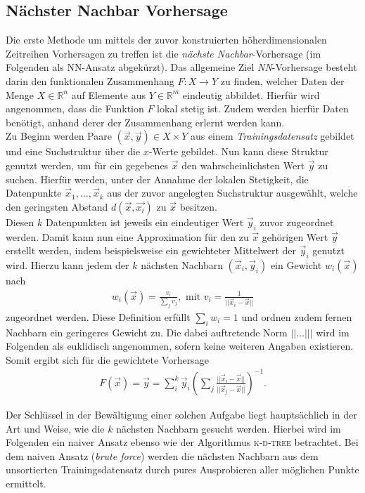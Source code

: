 \subsection{Nächster Nachbar Vorhersage}
\label{sc:theory_nn}
Die erste Methode um mittels der zuvor konstruierten höherdimensionalen Zeitreihen Vorhersagen zu treffen ist die \textit{nächste Nachbar}-Vorhersage (im Folgenden als \textsc{NN}-Ansatz abgekürzt). Das allgemeine Ziel \textit{NN}-Vorhersage besteht darin den funktionalen Zusammenhang $F : X \rightarrow Y$ zu finden, welcher Daten der Menge $X \in \mathbb{R}^n$ auf Elemente aus $Y \in \mathbb{R}^m$ eindeutig abbildet. Hierfür wird angenommen, dass die Funktion $F$ lokal stetig ist. Zudem werden hierfür Daten benötigt, anhand derer der Zusammenhang erlernt werden kann.\\
Zu Beginn werden Paare $(\vec{x},\vec{y}) \in X \times Y$ aus einem \textit{Trainingsdatensatz} gebildet und eine Suchstruktur über die $x$-Werte gebildet. Nun kann diese Struktur genutzt werden, um für ein gegebenes $\vec{x}$ den wahrscheinlichsten Wert $\vec{y}$ zu suchen. Hierfür werden, unter der Annahme der lokalen Stetigkeit, die Datenpunkte $\vec{x}_1, ..., \vec{x}_k$ aus der zuvor angelegten Suchstruktur ausgewählt, welche den geringsten Abstand $d(\vec{x}, \vec{x_i})$ zu $\vec{x}$ besitzen.\\
Diesen $k$ Datenpunkten ist jeweils ein eindeutiger Wert $\vec{y}_i$ zuvor zugeordnet werden. Damit kann nun eine Approximation für den zu $\vec{x}$ gehörigen Wert $\vec{y}$ erstellt werden, indem beispielsweise ein gewichteter Mittelwert der $\vec{y}_i$ genutzt wird. Hierzu kann jedem der $k$ nächsten Nachbarn $(\vec{x}_i, \vec{y}_i)$ ein Gewicht $w_i(\vec{x})$ nach
\begin{align*}
w_i(\vec{x}) = \frac{v_i}{\sum_j v_j}, \text{ mit } v_i = \frac{1}{||\vec{x}_i-\vec{x}||} 
\end{align*}
zugeordnet werden. Diese Definition erfüllt $\sum_i w_i = 1$ und ordnen zudem fernen Nachbarn ein geringeres Gewicht zu. Die dabei auftretende Norm $||\ldots |||$ wird im Folgenden als euklidisch angenommen, sofern keine weiteren Angaben existieren. Somit ergibt sich für die gewichtete Vorhersage
\begin{align}
F(\vec{x}) = \vec{y} = \sum^k_i \vec{y}_i \left( \sum_j \frac{||\vec{x}_i-\vec{x}||}{||\vec{x}_j-\vec{x}||} \right) ^{-1}.
\end{align}

Der Schlüssel in der Bewältigung einer solchen Aufgabe liegt hauptsächlich in der Art und Weise, wie die $k$ nächsten Nachbarn gesucht werden. Hierbei wird im Folgenden ein naiver Ansatz ebenso wie der Algorithmus \textsc{k-d-tree} betrachtet. Bei dem naiven Ansatz (\textit{brute force}) werden die nächsten Nachbarn aus dem unsortierten Trainingsdatensatz durch pures Ausprobieren aller möglichen Punkte ermittelt.

